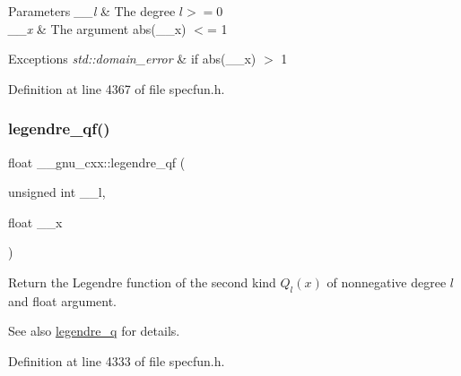 \begin{DoxyParams}{Parameters}
{\em \+\_\+\+\_\+l} & The degree $ l >= 0 $ \\
\hline
{\em \+\_\+\+\_\+x} & The argument {\ttfamily abs(\+\_\+\+\_\+x)} $<$= 1 \\
\hline
\end{DoxyParams}

\begin{DoxyExceptions}{Exceptions}
{\em std\+::domain\+\_\+error} & if {\ttfamily abs(\+\_\+\+\_\+x)} $>$ 1 \\
\hline
\end{DoxyExceptions}


Definition at line 4367 of file specfun.\+h.

\mbox{\label{group__gnu__math__spec__func_ga46cf4d58886af402c6776bc090b4e4a7}} 
\subsubsection{\texorpdfstring{legendre\+\_\+qf()}{legendre\_qf()}}
{\footnotesize\ttfamily float \+\_\+\+\_\+gnu\+\_\+cxx\+::legendre\+\_\+qf (\begin{DoxyParamCaption}\item[{unsigned int}]{\+\_\+\+\_\+l,  }\item[{float}]{\+\_\+\+\_\+x }\end{DoxyParamCaption})\hspace{0.3cm}{\ttfamily [inline]}}

Return the Legendre function of the second kind $ Q_l(x) $ of nonnegative degree $ l $ and {\ttfamily float} argument.

\begin{DoxySeeAlso}{See also}
\hyperlink{group__gnu__math__spec__func_gadad5b22d0075dca31690907668af568f}{legendre\+\_\+q} for details. 
\end{DoxySeeAlso}


Definition at line 4333 of file specfun.\+h.

\mbox{\label{group__gnu__math__spec__func_ga60feac5a8bd733abee6610adf15208f2}} 
